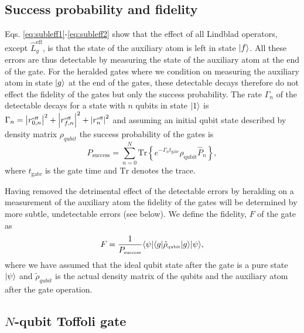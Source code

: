 \subsection{Success probability and fidelity}
Eqs. \eqref{eq:subleff1}-\eqref{eq:subleff2} show that the effect of all
Lindblad operators, except $\hat{L}_{g}^{\text{eff}}$, is that the state of the
auxiliary atom is left in state $| f \rangle$. All these errors are thus detectable
by measuring the state of the auxiliary atom at the end of the gate. For the
heralded gates where we condition on measuring the auxiliary atom in state
$| g \rangle$ at the end of the gates, these detectable decays therefore do not
effect the fidelity of the gates but only the success probability.  The rate
$\Gamma_{n}$ of the detectable decays for a state with $n$ qubits in state
$| 1 \rangle$ is
$\Gamma_{n}=\left| r_{0,n}^{\mbox{\tiny eff}} \right|^{2}+\left| r_{f,n}^{\mbox{\tiny eff}} \right|^{2}+\left| r_{n}^{\mbox{\tiny eff}} \right|^{2}$
and assuming an initial qubit state described by density matrix $\rho_{qubit}$
the success probability of the gates is
\begin{equation}
P_{\text{success}}=
\sum_{n=0}^{N}\text{Tr}
\left\{e^{-\Gamma_{n}t_{\text{gate}}}\rho_{\text{qubit}}\hat{P}_{n}\right\},
\end{equation}
where $t_{\text{gate}}$ is the gate time and $\text{Tr}$ denotes the trace. 

Having removed the detrimental effect of the detectable errors by heralding on a
measurement of the auxiliary atom the fidelity of the gates will be determined
by more subtle, undetectable errors (see below). We define the fidelity, $F$ of
the gate as
\begin{equation}
F=\frac{1}{P_{\mbox{\tiny success}}}\langle \psi |\langle g |
\tilde{\rho}_{\mbox{\tiny qubit}}| g \rangle| \psi \rangle,
\end{equation} 
where we have assumed that the ideal qubit state after the gate is a pure state
$| \psi \rangle$ and $\tilde{\rho}_{qubit}$ is the actual density matrix of the
qubits and the auxiliary atom after the gate operation.

\subsection{$N$-qubit Toffoli gate}

